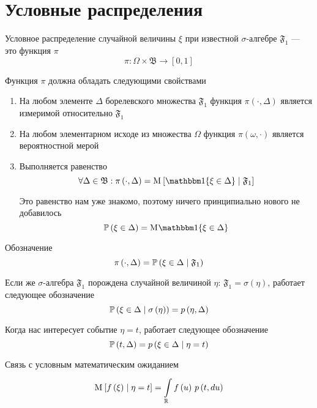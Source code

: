 \section{Условные распределения}

\begin{definition}
    Условное распределение случайной величины $\xi$
    при известной $\sigma$-алгебре $\mathfrak{F}_1$ --- это функция $\pi$
    $$\pi: \Omega \times \mathfrak{B} \rightarrow \left[ 0, 1 \right]$$
    
    Функция $\pi$ должна обладать следующими свойствами
    \begin{enumerate}
        \item На любом элементе $\Delta$ борелевского множества $\mathfrak{F}_1$
            функция $\pi\left( \cdot, \Delta \right)$ является измеримой
            относительно $\mathfrak{F}_1$
        \item На любом элементарном исходе из множества $\Omega$
            функция $\pi\left( \omega, \cdot \right)$
            является вероятностной мерой
        \item Выполняется равенство
            $$\forall \Delta \in \mathfrak{B}: \pi\left( \cdot, \Delta \right)
                = \Mean{\Indicator{\xi \in \Delta} \mcond \mathfrak{F}_1}$$

            Это равенство нам уже знакомо, поэтому ничего принципиально нового
            не добавилось
            $$\probability{\xi \in \Delta} = \mean{\Indicator{\xi \in \Delta}}$$
    \end{enumerate}

    Обозначение
    $$\pi\left( \cdot, \Delta \right)
        = \probability{\xi \in \Delta \mcond \mathfrak{F}_1}$$

    Если же $\sigma$-алгебра $\mathfrak{F}_1$ порождена
    случайной величиной $\eta$: $\mathfrak{F}_1 = \sigma\left( \eta \right)$,
    работает следующее обозначение
    $$\probability{\xi \in \Delta \mcond \sigma\left( \eta \right)}
        = \pdf{\eta, \Delta}$$

    Когда нас интересует событие $\eta = t$, работает следующее обозначение
    $$\probability{t, \Delta} = \pdf{\xi \in \Delta \mcond \eta = t}$$

    Связь с условным математическим ожиданием
    $$\Mean{f\left( \xi \right) \mcond \eta = t}
        = \integrall{\mathbb{R}}{\pdf{t, du}}{f\left( u \right)}$$
\end{definition}

